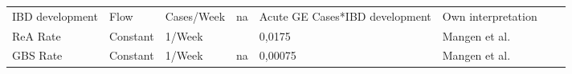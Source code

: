 \begin{landscape}
\begin{longtable}[c]{m{10em}lllm{15em}lll}
IBD development                               & Flow     & Cases/Week               & na                        & Acute GE Cases*IBD development                                                                                                                                                                                                                                                           & Own interpretation                                                                                                                                                                           &                                                                                                                                                                                                                                       \\
ReA Rate                                      & Constant & 1/Week                   &                           & 0,0175                                                                                                                                                                                                                                                                                   & Mangen et al.                                                                                                                                                                                &                                                                                                                                                                                                                                       \\
GBS Rate                                      & Constant & 1/Week                   & na                        & 0,00075                                                                                                                                                                                                                                                                                  & Mangen et al.                                                                                                                                                                                &                                                                                                                                                                                                                                       \\

\end{longtable}
\end{landscape}
